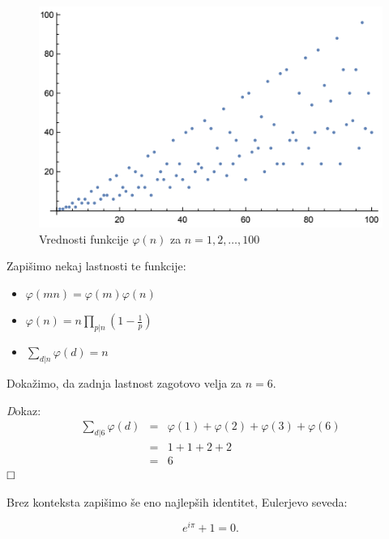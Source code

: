 \documentclass[a4paper,12pt]{article}
\def\qed{$\hfill\Box$}   %
\begin{document}

\begin{figure}[h!]
\includegraphics{eulerjeva.PNG}
\caption{Vrednosti funkcije $\varphi(n)$ za $n = 1,2,\ldots,100$}\label{fi100}
\end{figure}

\newpage
Zapišimo nekaj lastnosti te funkcije:
\begin{itemize}
\item $\varphi (mn)=\varphi (m)\varphi (n)$
\item $\varphi (n)=n \prod_{p|n}(1-\frac{1}{p})$
\item $\sum_{d|n}\varphi(d)=n$
\end{itemize}

Dokažimo, da zadnja lastnost zagotovo velja za $n=6$.

{\emph Dokaz:}
\begin{eqnarray*}
\sum_{d|6}\varphi(d) &=& \varphi(1) + \varphi(2)+\varphi(3) + \varphi(6) \\
&=& 1 + 1+2+2 \\
&=& 6
\end{eqnarray*} \qed

Brez konteksta zapišimo še eno najlepših identitet, Eulerjevo seveda:

$$e^{i\pi}+1=0.$$
\end{document}
